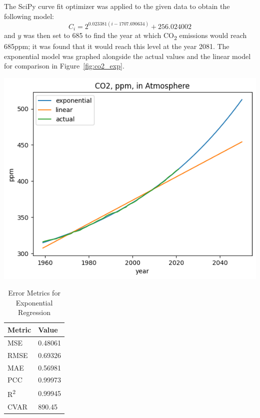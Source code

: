 \documentclass[12pt]{mcmthesis}
\begin{document}
    The SciPy curve fit optimizer was applied to the given data to obtain the following model:
%
    \begin{equation}
        C_i = 2^{0.023381 (i - 1707.690634)} + 256.024002
        \label{eq:co2_exp}
    \end{equation}
%
    and $y$ was then set to 685 to find the year at which CO\textsubscript{2} emissions would reach 685ppm; it was found that it would reach this level at the year 2081.
    The exponential model was graphed alongside the actual values and the linear model for comparison in Figure~\ref{fig:co2_exp}.

    \begin{table}[h]
        \begin{minipage}{0.7\linewidth}
            \centering
            \includegraphics[width=\textwidth]{exponential}%
            \label{fig:co2_exp}
        \end{minipage}%
        \begin{minipage}{0.3\linewidth}
            \centering
            \begin{tabular}{ll}
                \toprule
                Metric               & Value   \\
                \midrule
                MSE                  & 0.48061 \\
                RMSE                 & 0.69326 \\
                MAE                  & 0.56981 \\
                PCC                  & 0.99973 \\
                R\textsuperscript{2} & 0.99945 \\
                CVAR                 & 890.45  \\
                \bottomrule
            \end{tabular}
            \vspace{8pt}
            \caption{Error Metrics for Exponential Regression}
            \label{tab:co2_exp_err}
        \end{minipage}
    \end{table}
\end{document}
